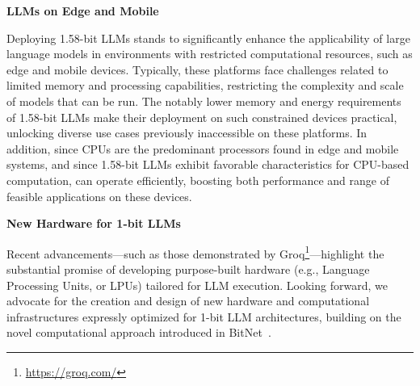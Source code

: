 \textbf{LLMs on Edge and Mobile}

Deploying 1.58-bit LLMs stands to significantly enhance the applicability of large language models in environments with restricted computational resources, such as edge and mobile devices. Typically, these platforms face challenges related to limited memory and processing capabilities, restricting the complexity and scale of models that can be run. The notably lower memory and energy requirements of 1.58-bit LLMs make their deployment on such constrained devices practical, unlocking diverse use cases previously inaccessible on these platforms. In addition, since CPUs are the predominant processors found in edge and mobile systems, and since 1.58-bit LLMs exhibit favorable characteristics for CPU-based computation,  can operate efficiently, boosting both performance and range of feasible applications on these devices.

\textbf{New Hardware for 1-bit LLMs}

Recent advancements—such as those demonstrated by Groq\footnote{\url{https://groq.com/}}—highlight the substantial promise of developing purpose-built hardware (e.g., Language Processing Units, or LPUs) tailored for LLM execution. Looking forward, we advocate for the creation and design of new hardware and computational infrastructures expressly optimized for 1-bit LLM architectures, building on the novel computational approach introduced in BitNet~\cite{bitnet}.
